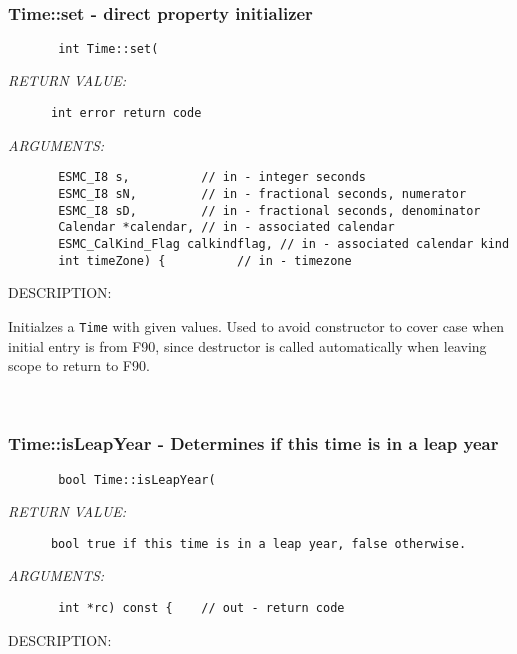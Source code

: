  
\mbox{}\hrulefill\ 
 
\subsubsection [Time::set] {Time::set - direct property initializer}


  
\begin{verbatim}       int Time::set(\end{verbatim}{\em RETURN VALUE:}
\begin{verbatim}      int error return code\end{verbatim}{\em ARGUMENTS:}
\begin{verbatim}       ESMC_I8 s,          // in - integer seconds
       ESMC_I8 sN,         // in - fractional seconds, numerator
       ESMC_I8 sD,         // in - fractional seconds, denominator
       Calendar *calendar, // in - associated calendar
       ESMC_CalKind_Flag calkindflag, // in - associated calendar kind
       int timeZone) {          // in - timezone\end{verbatim}
{\sf DESCRIPTION:\\ }


        Initialzes a {\tt Time} with given values.  Used to avoid constructor
        to cover case when initial entry is from F90, since destructor is called
        automatically when leaving scope to return to F90.
   
 
\mbox{}\hrulefill\ 
 
\subsubsection [Time::isLeapYear] {Time::isLeapYear - Determines if this time is in a leap year}


  
\begin{verbatim}       bool Time::isLeapYear(\end{verbatim}{\em RETURN VALUE:}
\begin{verbatim}      bool true if this time is in a leap year, false otherwise.\end{verbatim}{\em ARGUMENTS:}
\begin{verbatim}       int *rc) const {    // out - return code\end{verbatim}
{\sf DESCRIPTION:\\ }


